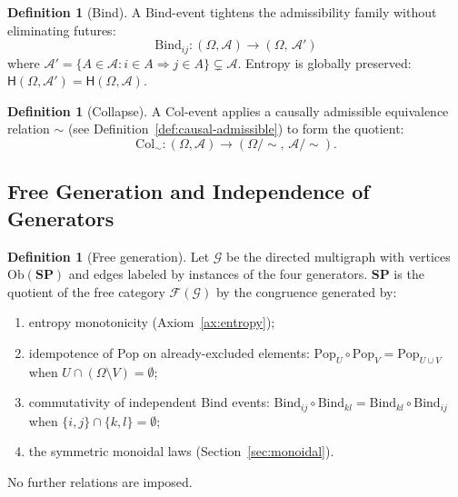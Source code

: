 \documentclass[12pt,a4paper]{article}
\theoremstyle{definition}
\newtheorem{definition}[theorem]{Definition}
\theoremstyle{remark}
\newcommand{\Ent}{\ensuremath{\mathsf{H}}}
\newcommand{\SP}{\mathbf{SP}}
\newcommand{\Ob}{\mathrm{Ob}}
\newcommand{\Pop}{\ensuremath{\mathrm{Pop}}}
\newcommand{\Bind}{\ensuremath{\mathrm{Bind}}}
\newcommand{\Col}{\ensuremath{\mathrm{Col}}}
\begin{document}
\begin{definition}[Bind]
\label{def:bind}
A $\Bind$-event tightens the admissibility family without eliminating futures:
\[
  \Bind_{ij} : (\Omega,\mathcal{A}) \longrightarrow
  (\Omega,\,\mathcal{A}')
\]
where $\mathcal{A}'=\{A\in\mathcal{A}: i\in A\Rightarrow j\in A\}\subsetneq\mathcal{A}$.
Entropy is globally preserved: $\Ent(\Omega,\mathcal{A}')=\Ent(\Omega,\mathcal{A})$.
\end{definition}

\begin{definition}[Collapse]
\label{def:col}
A $\Col$-event applies a causally admissible equivalence relation $\sim$ (see
Definition~\ref{def:causal-admissible}) to form the quotient:
\[
  \Col_\sim : (\Omega,\mathcal{A}) \longrightarrow
  (\Omega/{\sim},\,\mathcal{A}/{\sim}).
\]
\end{definition}

\subsection{Free Generation and Independence of Generators}

\begin{definition}[Free generation]
\label{def:free-gen}
Let $\mathcal{G}$ be the directed multigraph with vertices $\Ob(\SP)$ and edges
labeled by instances of the four generators. $\SP$ is the quotient of the free
category $\mathcal{F}(\mathcal{G})$ by the congruence generated by:
\begin{enumerate}[label=(\alph*)]
\item entropy monotonicity (Axiom~\ref{ax:entropy});
\item idempotence of Pop on already-excluded elements: $\Pop_U\circ\Pop_V
  =\Pop_{U\cup V}$ when $U\cap(\Omega\setminus V)=\emptyset$;
\item commutativity of independent Bind events: $\Bind_{ij}\circ\Bind_{kl}
  =\Bind_{kl}\circ\Bind_{ij}$ when $\{i,j\}\cap\{k,l\}=\emptyset$;
\item the symmetric monoidal laws (Section~\ref{sec:monoidal}).
\end{enumerate}
No further relations are imposed.
\end{definition}
\end{document}
